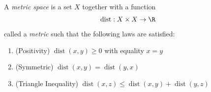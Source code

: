 
\begin{definition}
  \label{def:metricspaces}
  A \emph{metric space} is a set $X$ together with a function
  $$ \operatorname{dist}: X \times X \to \R $$
  called a \emph{metric} such that the following laws are satisfied:

  \begin{enumerate}
    \item (Positivity) $\operatorname{dist}(x,y) \ge 0$ with equality $x = y$
    \item (Symmetric) $\operatorname{dist}(x,y) = \operatorname{dist}(y,x)$
    \item (Triangle Inequality) $\operatorname{dist}(x,z) \le \operatorname{dist}(x,y) + \operatorname{dist}(y,z)$
  \end{enumerate}
\end{definition}
